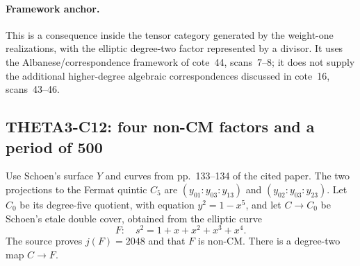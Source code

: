 \documentclass[11pt]{article}
\theoremstyle{definition}\newtheorem{definition}[theorem]{Definition}\newtheorem{remark}[theorem]{Remark}
\begin{document}
\paragraph{Framework anchor.}
This is a consequence inside the tensor category generated by the
weight-one realizations, with the elliptic degree-two factor represented
by a divisor.  It uses the Albanese/correspondence framework of cote~44,
scans~7--8; it does not supply the additional higher-degree algebraic
correspondences discussed in cote~16, scans~43--46.



\subsection{THETA3-C12: four non-CM factors and a period of 500}\label{C12}
Use Schoen's surface $Y$ and curves from pp.~133--134 of the cited paper. The two projections to the Fermat quintic $C_5$ are
$(y_{01}:y_{03}:y_{13})$ and $(y_{02}:y_{03}:y_{23})$.
Let $C_0$ be its degree-five quotient, with equation $y^2=1-x^5$, and let $C\to C_0$ be Schoen's etale double cover, obtained from the elliptic curve
\[
 F:\quad s^2=1+x+x^2+x^3+x^4.
\]
The source proves $j(F)=2048$ and that $F$ is non-CM. There is a degree-two map $C\to F$.
\end{document}
